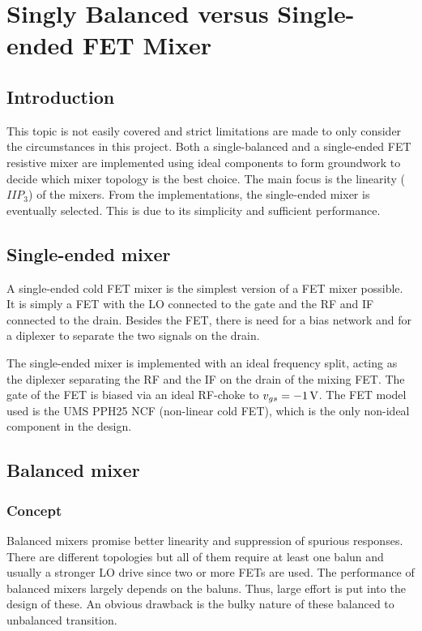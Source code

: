 \chapter{Singly Balanced versus Single-ended FET Mixer}\label{sec:endvsbal}
	\section{Introduction}
		This topic is not easily covered and strict limitations are made to only consider the circumstances in this project. Both a single-balanced and a single-ended FET resistive mixer are implemented using ideal components to form groundwork to decide which mixer topology is the best choice. The main focus is the linearity ($IIP_3$) of the mixers. From the implementations, the single-ended mixer is eventually selected. This is due to its simplicity and sufficient performance.

	\section{Single-ended mixer}
		A single-ended cold FET mixer is the simplest version of a FET mixer possible. It is simply a FET with the LO connected to the gate and the RF and IF connected to the drain. Besides the FET, there is need for a bias network and for a diplexer to separate the two signals on the drain.

		The single-ended mixer is implemented with an ideal frequency split, acting as the diplexer separating the RF and the IF on the drain of the mixing FET. The gate of the FET is biased via an ideal RF-choke to $v_{gs}=\unit[-1]{V}$. The FET model used is the UMS PPH25 NCF (non-linear cold FET), which is the only non-ideal component in the design.

	\section{Balanced mixer}
		\subsection{Concept}
			Balanced mixers promise better linearity and suppression of spurious responses. There are different topologies but all of them require at least one balun and usually a stronger LO drive since two or more FETs are used. The performance of balanced mixers largely depends on the baluns. Thus, large effort is put into the design of these. An obvious drawback is the bulky nature of these balanced to unbalanced transition.

